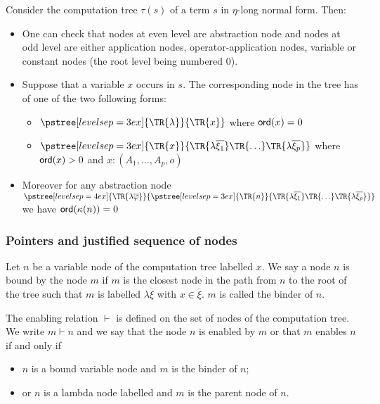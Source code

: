 Consider the computation tree $\tau(s)$ of a term $s$ in $\eta$-long normal form. Then:
\begin{itemize}
\item One can check that nodes at even level are abstraction
node and nodes at odd level are either application nodes,
operator-application nodes, variable or constant nodes (the root level being numbered $0$).

\item Suppose that a variable $x$ occurs in $s$. The corresponding node in the tree has of one of the two following forms:
    \begin{itemize}
    \item $ \pstree[levelsep=3ex]
        { \TR{\lambda } }
        { \TR{x}
        }$ where ${\sf ord}(x) = 0$

    \item $ \pstree[levelsep=3ex]
                { \TR{x} }
                { \TR{\lambda \overline{\xi_1}} \TR{\ldots} \TR{\lambda \overline{\xi_p}}}
        $ where ${\sf ord}(x) > 0$ and $x:(A_1,\ldots,A_p,o)$
    \end{itemize}

\item    Moreover for any abstraction node
        $ \pstree[levelsep=4ex]
            { \TR{\lambda \overline{\varphi}} }
            { \pstree[levelsep=3ex]
                {\TR{n}}
                {\TR{\lambda \overline{\xi_1}} \TR{\ldots} \TR{\lambda \overline{\xi_p}}}
            }
        $
    we have ${\sf ord}(\kappa(n))=0$

\end{itemize}



\subsubsection{Pointers and justified sequence of nodes}

\begin{dfn}[Binder]
Let $n$ be a variable node of the computation tree labelled $x$. We
say a node $n$ is bound by the node $m$ if $m$ is the closest node
in the path from $n$ to the root of the tree such that $m$ is
labelled $\lambda \overline{\xi}$ with $x\in \overline{\xi}$. $m$ is
called the binder of $n$.
\end{dfn}

\begin{dfn}[Enabling]
The enabling relation $\vdash$ is defined on the set of nodes of the
computation tree. We write $m \vdash n$ and we say that the node $n$
is enabled by $m$ or that $m$ enables $n$ if and only if
\begin{itemize}
\item $n$ is a bound variable node and $m$ is the binder of $n$;
\item or $n$ is a lambda node labelled and $m$ is the parent node of $n$.
\end{itemize}
\end{dfn}



